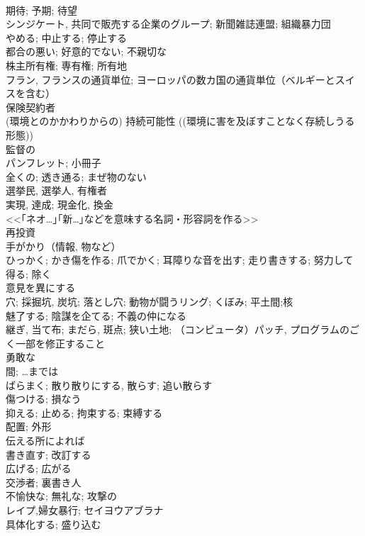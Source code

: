 \documentclass[8pt]{extreport}
\begin{document}
\begin{CJK}{UTF8}{min}
\\	期待; 予期; 待望	
\\	シンジケート, 共同で販売する企業のグループ; 新聞雑誌連盟; 組織暴力団	
\\	やめる; 中止する; 停止する	
\\	都合の悪い; 好意的でない; 不親切な	
\\	株主所有権; 専有権; 所有地	
\\	フラン, フランスの通貨単位; ヨーロッパの数カ国の通貨単位（ベルギーとスイスを含む）	
\\	保険契約者	
\\	(環境とのかかわりからの) 持続可能性 ((環境に害を及ぼすことなく存続しうる形態))	
\\	監督の	
\\	パンフレット; 小冊子	
\\	全くの; 透き通る; まぜ物のない	
\\	選挙民, 選挙人, 有権者	
\\	実現, 達成; 現金化, 換金	
\\	<<｢ネオ…｣｢新…｣などを意味する名詞・形容詞を作る>>	
\\	再投資	
\\	手がかり（情報, 物など）	
\\	ひっかく; かき傷を作る; 爪でかく; 耳障りな音を出す; 走り書きする; 努力して得る; 除く	
\\	意見を異にする	
\\	穴; 採掘坑, 炭坑; 落とし穴; 動物が闘うリング; くぼみ; 平土間;核	
\\	魅了する; 陰謀を企てる; 不義の仲になる	
\\	継ぎ, 当て布; まだら, 斑点; 狭い土地; （コンピュータ）パッチ, プログラムのごく一部を修正すること	
\\	勇敢な	
\\	間; …までは	
\\	ばらまく; 散り散りにする, 散らす; 追い散らす	
\\	傷つける; 損なう	
\\	抑える; 止める; 拘束する; 束縛する	
\\	配置; 外形	
\\	伝える所によれば	
\\	書き直す; 改訂する	
\\	広げる; 広がる	
\\	交渉者; 裏書き人	
\\	不愉快な; 無礼な; 攻撃の	
\\	レイプ,婦女暴行; セイヨウアブラナ	
\\	具体化する; 盛り込む	

\end{CJK}
\end{document}

